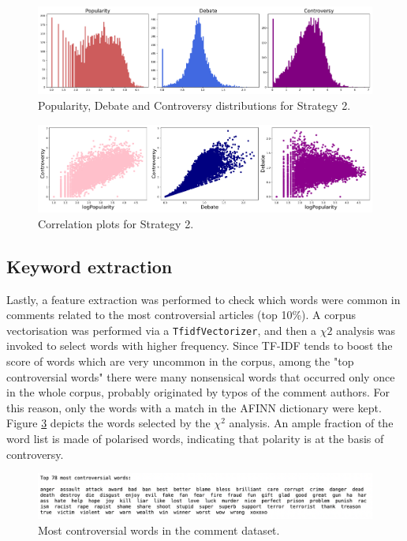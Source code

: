\begin{figure}
\centering
\includegraphics[width=\tw]{Pictures/Strat2Dist.pdf}
\caption{Popularity, Debate and Controversy distributions for Strategy 2.}
\label{Str1Dist}
\end{figure}


\begin{figure}[tb]
\centering
\includegraphics[width=\tw]{Pictures/Strat2Corr.pdf}
\caption{Correlation plots for Strategy 2.}
\label{Str1Corr}
\end{figure}


\subsection{Keyword extraction}
Lastly, a feature extraction was performed to check which words were common in comments related to the most controversial articles (top 10\%). A corpus vectorisation was performed via a {\tt TfidfVectorizer}, and then a $\chi2$ analysis was invoked to select words with higher frequency. Since TF-IDF tends to boost the score of words which are very uncommon in the corpus, among the "top controversial words" there were many nonsensical words that occurred only once in the whole corpus, probably originated by typos of the comment authors. For this reason, only the words with a match in the AFINN dictionary were kept. Figure \ref{TopWords} depicts the words selected by the $\chi^2$ analysis. An ample fraction of the word list is made of polarised words, indicating that polarity is at the basis of controversy.

\begin{figure}
\centering
\includegraphics[width=\tw]{Pictures/TopWs.png}
\caption{Most controversial words in the comment dataset.}
\label{TopWords}
\end{figure}

